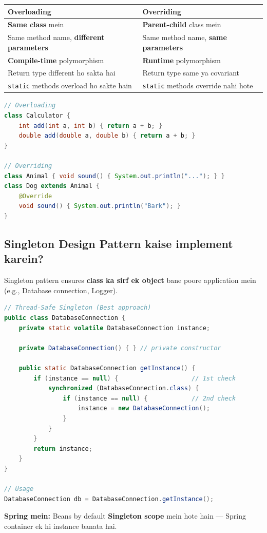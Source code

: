 \documentclass[12pt,a4paper]{article}
\begin{document}
\begin{answerbox}
\begin{center}
\begin{tabular}{p{6cm} p{6cm}}
\toprule
\textbf{Overloading} & \textbf{Overriding} \\
\midrule
\textbf{Same class} mein & \textbf{Parent-child} class mein \\
Same method name, \textbf{different parameters} & Same method name, \textbf{same parameters} \\
\textbf{Compile-time} polymorphism & \textbf{Runtime} polymorphism \\
Return type different ho sakta hai & Return type same ya covariant \\
\texttt{static} methods overload ho sakte hain & \texttt{static} methods override nahi hote \\
\bottomrule
\end{tabular}
\end{center}
\begin{lstlisting}[language=Java]
// Overloading
class Calculator {
    int add(int a, int b) { return a + b; }
    double add(double a, double b) { return a + b; }
}

// Overriding
class Animal { void sound() { System.out.println("..."); } }
class Dog extends Animal {
    @Override
    void sound() { System.out.println("Bark"); }
}
\end{lstlisting}
\end{answerbox}

\subsection{Singleton Design Pattern kaise implement karein?}

\begin{answerbox}
Singleton pattern ensures \textbf{class ka sirf ek object} bane poore application mein (e.g., Database connection, Logger).
\begin{lstlisting}[language=Java]
// Thread-Safe Singleton (Best approach)
public class DatabaseConnection {
    private static volatile DatabaseConnection instance;
    
    private DatabaseConnection() { } // private constructor
    
    public static DatabaseConnection getInstance() {
        if (instance == null) {                    // 1st check
            synchronized (DatabaseConnection.class) {
                if (instance == null) {            // 2nd check
                    instance = new DatabaseConnection();
                }
            }
        }
        return instance;
    }
}

// Usage
DatabaseConnection db = DatabaseConnection.getInstance();
\end{lstlisting}
\textbf{Spring mein:} Beans by default \textbf{Singleton scope} mein hote hain --- Spring container ek hi instance banata hai.
\end{answerbox}
\end{document}
